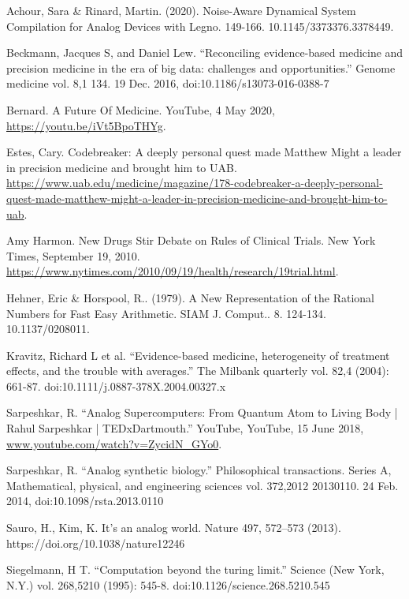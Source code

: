 \newpage

\newcommand{\sourceEntry}[2]{
\bibent
{#2}

}

\begin{workscited}
\sourceEntry{Achour}{Achour, Sara \& Rinard, Martin. (2020). Noise-Aware Dynamical System Compilation for Analog Devices with Legno. 149-166. 10.1145/3373376.3378449. }
\sourceEntry{Beckmann}{Beckmann, Jacques S, and Daniel Lew. “Reconciling evidence-based medicine and precision medicine in the era of big data: challenges and opportunities.” Genome medicine vol. 8,1 134. 19 Dec. 2016, doi:10.1186/s13073-016-0388-7}
\sourceEntry{Bernard}{Bernard. A Future Of Medicine. YouTube, 4 May 2020, \url{https://youtu.be/iVt5BpoTHYg}.}
\sourceEntry{Estes}{Estes, Cary. Codebreaker: A deeply personal quest made Matthew Might a leader in precision medicine and brought him to UAB. \url{https://www.uab.edu/medicine/magazine/178-codebreaker-a-deeply-personal-quest-made-matthew-might-a-leader-in-precision-medicine-and-brought-him-to-uab}.}
\sourceEntry{Harmon}{Amy Harmon. New Drugs Stir Debate on Rules of Clinical Trials. New York Times, September 19, 2010. \url{https://www.nytimes.com/2010/09/19/health/research/19trial.html}.}
\sourceEntry{Hehner}{Hehner, Eric \& Horspool, R.. (1979). A New Representation of the Rational Numbers for Fast Easy Arithmetic. SIAM J. Comput.. 8. 124-134. 10.1137/0208011.}
\sourceEntry{Kravitz}{Kravitz, Richard L et al. “Evidence-based medicine, heterogeneity of treatment effects, and the trouble with averages.” The Milbank quarterly vol. 82,4 (2004): 661-87. doi:10.1111/j.0887-378X.2004.00327.x}
\sourceEntry{Sarpeshkar}{Sarpeshkar, R. “Analog Supercomputers: From Quantum Atom to Living Body | Rahul Sarpeshkar | TEDxDartmouth.” YouTube, YouTube, 15 June 2018, \url{www.youtube.com/watch?v=ZycidN_GYo0}.}
\sourceEntry{Sarpeshkar}{Sarpeshkar, R. “Analog synthetic biology.” Philosophical transactions. Series A, Mathematical, physical, and engineering sciences vol. 372,2012 20130110. 24 Feb. 2014, doi:10.1098/rsta.2013.0110}
\sourceEntry{Sauro}{Sauro, H., Kim, K. It's an analog world. Nature 497, 572–573 (2013). https://doi.org/10.1038/nature12246}
\sourceEntry{Siegelmann}{Siegelmann, H T. “Computation beyond the turing limit.” Science (New York, N.Y.) vol. 268,5210 (1995): 545-8. doi:10.1126/science.268.5210.545}

\end{workscited}
